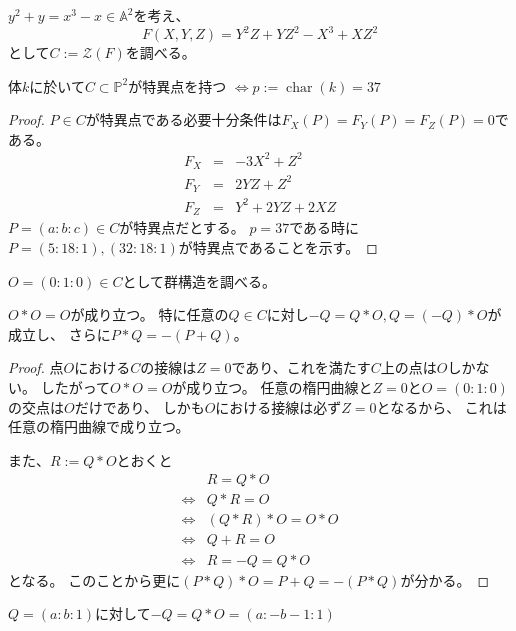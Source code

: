 \documentclass[a4]{article}
\newcommand{\affine}{\mathbb{A}}
\newcommand{\proj}{\mathbb{P}}
\begin{document}
        \begin{Example}
            $y^2+y=x^3-x \in \affine^2$を考え、
            \[ F(X,Y,Z)=Y^2Z+YZ^2-X^3+XZ^2 \]として$C:=\mathcal{Z}(F)$を調べる。
            \begin{Lemma}
                体$k$に於いて$C \subset \proj^2$が特異点を持つ $\iff p:=\operatorname{char}(k)=37$
            \end{Lemma}
            \begin{proof}
            $P \in C$が特異点である必要十分条件は$F_X(P)=F_Y(P)=F_Z(P)=0$である。
            \begin{eqnarray*}
                F_X&=&-3X^2+Z^2 \\
                F_Y&=&2YZ+Z^2 \\
                F_Z&=&Y^2+2YZ+2XZ
            \end{eqnarray*}
            $P=(a:b:c) \in C$が特異点だとする。
            $p=37$である時に$P=(5:18:1),(32:18:1)$が特異点であることを示す。
            \end{proof}

            $O=(0:1:0) \in C$として群構造を調べる。

            \begin{Lemma}
            $O \ast O=O$が成り立つ。
            特に任意の$Q \in C$に対し$-Q=Q \ast O, Q=(-Q) \ast O$が成立し、
            さらに$P \ast Q=-(P + Q)$。
            \end{Lemma}
            \begin{proof}
                点$O$における$C$の接線は$Z=0$であり、これを満たす$C$上の点は$O$しかない。
                したがって$O \ast O=O$が成り立つ。
                任意の楕円曲線と$Z=0$と$O=(0:1:0)$の交点は$O$だけであり、
                しかも$O$における接線は必ず$Z=0$となるから、
                これは任意の楕円曲線で成り立つ。
                
                また、$R:=Q \ast O$とおくと
                \begin{align*}
                    {}& R=Q \ast O \\
                    \iff& Q \ast R=O \\
                    \iff& (Q \ast R) \ast O=O \ast O \\
                    \iff& Q+R=O \\
                    \iff& R=-Q=Q \ast O
                \end{align*}
                となる。
                このことから更に$(P \ast Q) \ast O=P+Q=-(P \ast Q)$が分かる。
            \end{proof}

            \begin{Lemma}
                $Q=(a:b:1)$に対して$-Q=Q \ast O=(a:-b-1:1)$
            \end{Lemma}

        \end{Example}
\end{document}
